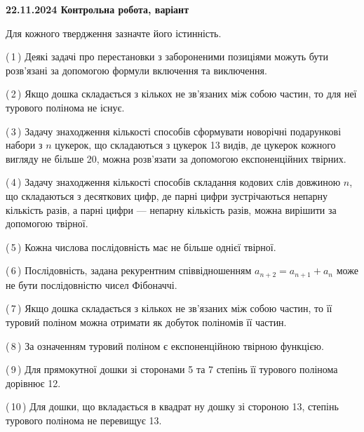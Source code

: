 \documentclass[12pt, ukrainian]{article}
\begin{document}
\begin {large}
\begin {large}
\begin {large}
\begin {large}
\begin {large}

\textbf{22.11.2024 Контрольна робота, варіант  }\par


{
Для кожного твердження зазначте його істинність.\par

\vspace{2mm}

(\,1\,) Деякі задачі про перестановки з забороненими позиціями можуть бути розв’я\-за\-ні за допомогою формули включення та виключення.%



(\,2\,) Якщо дошка складається з кількох не зв’язаних між собою частин, то для неї турового полінома не існує.%



(\,3\,) Задачу знаходження кількості способів сформувати новорічні подарункові набори з $n$ цукерок, що складаються з цукерок 13 видів, де цукерок кожного вигляду не більше 20, можна розв’язати за допомогою експоненційних твірних.%



(\,4\,) Задачу знаходження кількості способів складання кодових слів довжиною $n$, що складаються з десяткових цифр, де парні цифри зустрічаються непарну кількість разів, а парні цифри — непарну кількість разів, можна вирішити за допомогою твірної.%



(\,5\,) Кожна числова послідовність має не більше однієї твірної.%



(\,6\,) Послідовність, задана рекурентним співвідношенням $a_{n+2}=a_{n+1}+a_{n}$ може не бути послідовністю чисел Фібоначчі.%



(\,7\,) Якщо дошка складається з кількох не зв’язаних між собою частин, то її туровий поліном можна отримати як добуток поліномів її частин.%



(\,8\,) За означенням туровий поліном є експоненційною твірною функцією.%



(\,9\,) Для прямокутної дошки зі сторонами 5 та 7 степінь її турового полінома дорівнює 12.%



(\,10\,) Для дошки, що вкладається в квадрат ну дошку зі стороною 13, степінь турового полінома не перевищує 13.%




}
\end{large}
\end{large}
\end{large}
\end{large}
\end{large}
\end{document}
